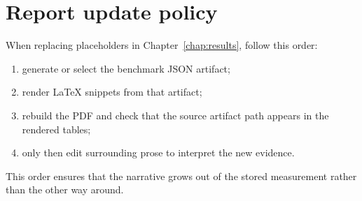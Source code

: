 \section{Report update policy}

When replacing placeholders in Chapter~\ref{chap:results}, follow this order:
\begin{enumerate}
  \item generate or select the benchmark JSON artifact;
  \item render LaTeX snippets from that artifact;
  \item rebuild the PDF and check that the source artifact path appears in the rendered tables;
  \item only then edit surrounding prose to interpret the new evidence.
\end{enumerate}

This order ensures that the narrative grows out of the stored measurement rather than the other way around.
